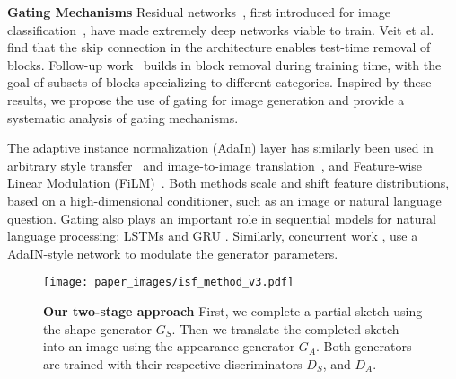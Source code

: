 \noindent \textbf{Gating Mechanisms}
Residual networks~\cite{he2016deep}, first introduced for image classification~\cite{krizhevsky2012imagenet}, have made extremely deep networks viable to train. Veit et al.~\cite{veit2016residual} find that the skip connection in the architecture enables test-time removal of blocks. Follow-up work~\cite{veit2018adaptive} builds in block removal during training time, with the goal of subsets of blocks specializing to different categories. Inspired by these results, we propose the use of gating for image generation and provide a systematic analysis of gating mechanisms.

The adaptive instance normalization (AdaIn) layer has similarly been used in arbitrary style transfer~\cite{huang2017arbitrary} and image-to-image translation~\cite{huang2018multimodal}, and Feature-wise Linear Modulation (FiLM)~\cite{perez2017film}. Both methods scale and shift feature distributions, based on a high-dimensional conditioner, such as an image or natural language question. Gating also plays an important role in sequential models for natural language processing: LSTMs \cite{hochreiter1997long} and GRU \cite{cho2014learning}. Similarly, concurrent work \cite{karras2018style}, \cite{park2019semantic} use a AdaIN-style network to modulate the generator parameters.


\begin{figure}[t]
	\centering  
	\texttt{[image: paper\_images/isf\_method\_v3.pdf]} 
	\\
	\vspace{-4mm}
	\caption{{\bf Our two-stage approach} First, we complete a partial sketch using the shape generator $G_S$. Then we translate the completed sketch into an image using the appearance generator $G_A$. Both generators are trained with their respective discriminators $D_S$, and $D_A$.
		{}}\label{fig:SketchFillNet}
\end{figure}





